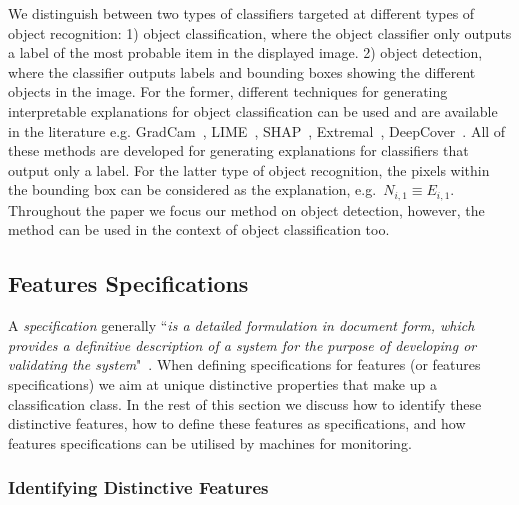 We distinguish between two types of classifiers targeted at different types of object recognition: 1) object classification, where the object classifier only outputs a label of the most probable item in the displayed image. 2) object detection, where the classifier outputs labels and bounding boxes showing the different objects in the image.
%
For the former, different techniques for generating interpretable explanations for object classification can be used and are available in the literature e.g. GradCam~\cite{Selvaraju2020}, LIME~\cite{Ribeiro2016}, SHAP~\cite{Lundberg2017}, Extremal~\cite{Fong2019}, DeepCover~\cite{Sun2020}. 
%
All of these methods are developed for generating explanations for classifiers that output only a label.%
%
For the latter type of object recognition, the pixels within the bounding box can be considered as the explanation, e.g.\ $N_{i,1}\equiv E_{i,1}$.
%
%
Throughout the paper we focus our method on object detection, however, the method can be used in the context of object classification too. 

 
\subsection{Features Specifications}
A \textit{specification} generally ``\textit{is a detailed formulation in document form, which provides a definitive description of a system for the purpose of developing or validating the system}"~\cite{ISO24765}\cite{Dhaminda2022a}. 
%
When defining specifications for features (or features specifications) we aim at unique distinctive properties that make up a classification class. In the rest of this section we discuss how to identify these distinctive features, how to define these features as specifications, and how features specifications can be utilised by machines for monitoring.  

\subsubsection{Identifying Distinctive Features}
 

